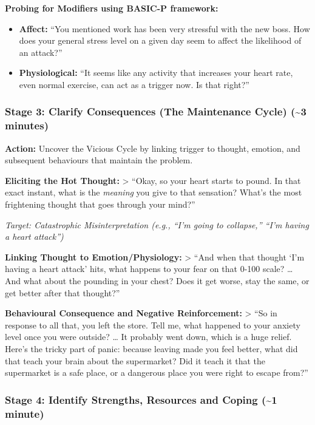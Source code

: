 \documentclass[
  american,
  11pt,
  11pt,
  letterpaper,
  onecolumn]{article}
\providecommand{\tightlist}{%
  \setlength{\itemsep}{0pt}\setlength{\parskip}{0pt}}
\begin{document}
\textbf{Probing for Modifiers using BASIC-P framework:}

\begin{itemize}
\tightlist
\item
  \textbf{Affect:} ``You mentioned work has been very stressful with the
  new boss. How does your general stress level on a given day seem to
  affect the likelihood of an attack?''
\item
  \textbf{Physiological:} ``It seems like any activity that increases
  your heart rate, even normal exercise, can act as a trigger now. Is
  that right?''
\end{itemize}

\subsubsection{Stage 3: Clarify Consequences (The Maintenance Cycle)
(\textasciitilde3
minutes)}\label{stage-3-clarify-consequences-the-maintenance-cycle-3-minutes}

\textbf{Action:} Uncover the Vicious Cycle by linking trigger to
thought, emotion, and subsequent behaviours that maintain the problem.

\textbf{Eliciting the Hot Thought:} \textgreater{} ``Okay, so your heart
starts to pound. In that exact instant, what is the \emph{meaning} you
give to that sensation? What's the most frightening thought that goes
through your mind?''

\emph{Target: Catastrophic Misinterpretation (e.g., ``I'm going to
collapse,'' ``I'm having a heart attack'')}

\textbf{Linking Thought to Emotion/Physiology:} \textgreater{} ``And
when that thought `I'm having a heart attack' hits, what happens to your
fear on that 0-100 scale? \ldots{} And what about the pounding in your
chest? Does it get worse, stay the same, or get better after that
thought?''

\textbf{Behavioural Consequence and Negative Reinforcement:}
\textgreater{} ``So in response to all that, you left the store. Tell
me, what happened to your anxiety level once you were outside? \ldots{}
It probably went down, which is a huge relief. Here's the tricky part of
panic: because leaving made you feel better, what did that teach your
brain about the supermarket? Did it teach it that the supermarket is a
safe place, or a dangerous place you were right to escape from?''

\subsubsection{Stage 4: Identify Strengths, Resources and Coping
(\textasciitilde1
minute)}\label{stage-4-identify-strengths-resources-and-coping-1-minute}
\end{document}
